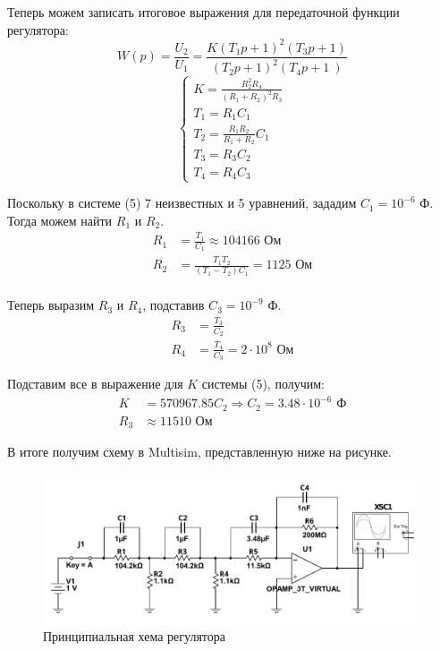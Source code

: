 \documentclass[russian, utf8]{eskdtext}
\begin{document}
Теперь можем записать итоговое выражения для передаточной функции регулятора:
\begin{equation*}
    W(p) = \frac{U_2}{U_1} = \frac{K\left(T_1p + 1 \right)^2 \left( T_3p + 1 \right)}{\left( T_2p + 1 \right)^2 \left( T_4p + 1 \ \right)} 
\end{equation*}
\begin{equation}
    \begin{cases}
    K  = \frac{R_2^2R_4}{(R_1 + R_2)^2R_3} \\
    T_1 = R_1C_1 \\
    T_2 = \frac{R_1R_2}{R_1 + R_2}C_1 \\
    T_3 = R_3C_2 \\
    T_4 = R_4C_3
    \end{cases}
\end{equation}

\newpage
Поскольку в системе (5) 7 неизвестных и 5 уравнений, зададим $C_1 = 10^{-6}$ Ф. Тогда можем найти $R_1$ и $R_2$.
\begin{align*}
    R_1 & = \frac{T_1}{C_1} \approx 104166 \text{ Ом}\\
    R_2 & = \frac{T_1T_2}{(T_1 - T_2)C_1} = 1125 \text{ Ом}\\
\end{align*}

Теперь выразим $R_3$ и $R_4$, подставив $C_3 = 10^{-9}$ Ф.
\begin{align*}
    R_3 & = \frac{T_3}{C_2} \\
    R_4 & = \frac{T_4}{C_3} = 2\cdot 10^8 \text{ Ом}
\end{align*}

Подставим все в выражение для $K$ системы (5), получим:
\begin{align*}
    K & = 570967.85C_2 \Rightarrow C_2 = 3.48 \cdot 10^{-6} \text{ Ф}\\
    R_3 & \approx 11510 \text{ Ом}
\end{align*}

В итоге получим схему в Multisim, представленную ниже на рисунке.

\begin{figure}[h!]
    \centering
    \includegraphics{images/ElectricScheme.pdf}
    \caption{Принципиальная хема регулятора}
\end{figure}
\end{document}
